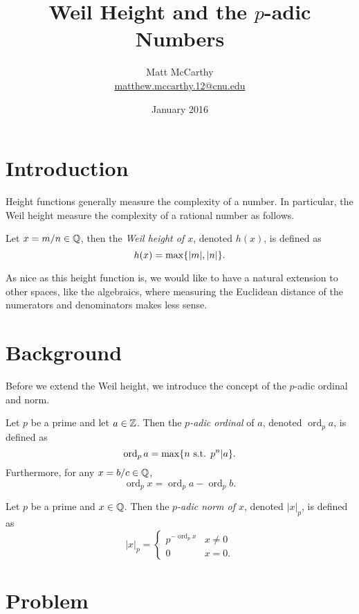 \documentclass[notitlepage]{simple}
\title{Weil Height and the $p$-adic Numbers}
\date{January 2016}
\author{Matt McCarthy\\\href{mailto:matthew.mccarthy.12@cnu.edu}{matthew.mccarthy.12@cnu.edu}}
\def\ord{\operatorname{ord}}
\begin{document}
\maketitle

\section{Introduction}

Height functions generally measure the complexity of a number.
In particular, the Weil height measure the complexity of a rational number as follows.

\begin{definition}\label{weil1}
	Let $x=m/n\in\mathbb{Q}$, then the \textit{Weil height of $x$}, denoted $h(x)$, is defined as
	\[
		h(x)=\max\lbrace |m|,|n| \rbrace.
	\]
\end{definition}

As nice as this height function is, we would like to have a natural extension to other spaces, like the algebraics, where measuring the Euclidean distance of the numerators and denominators makes less sense.

\section{Background}

Before we extend the Weil height, we introduce the concept of the $p$-adic ordinal and norm.

\begin{definition}
	Let $p$ be a prime and let $a\in\mathbb{Z}$.
	Then the \textit{$p$-adic ordinal} of $a$, denoted $\ord_p a$, is defined as
	\[
		\ord_p a = \max\set{n\text{ s.t. } p^n | a}.
	\]
	Furthermore, for any $x=b/c\in\mathbb{Q}$,
	\[
		\ord_p x = \ord_p a - \ord_p b.
	\]
\end{definition}

\begin{definition}
	Let $p$ be a prime and $x\in\mathbb{Q}$.
	Then the \textit{$p$-adic norm of $x$}, denoted $|x|_p$, is defined as
	\[
		|x|_p =
		\begin{cases}
			p^{-\ord_p x} & x\neq 0\\
			0 & x=0.
		\end{cases}
	\]
\end{definition}

\section{Problem}
\end{document}
